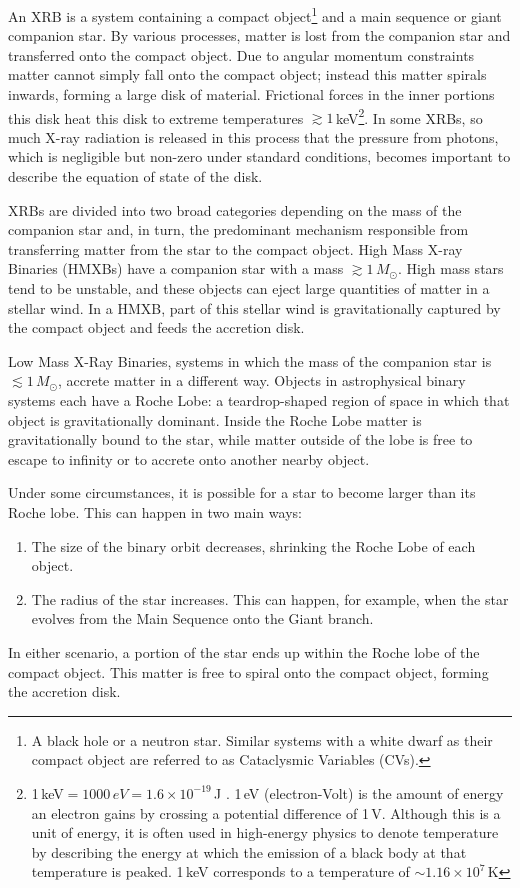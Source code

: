 \par An XRB is a system containing a compact object\footnote{A black hole or a neutron star.  Similar systems with a white dwarf as their compact object are referred to as Cataclysmic Variables (CVs).} and a main sequence or giant companion star.  By various processes, matter is lost from the companion star and transferred onto the compact object.  Due to angular momentum constraints matter cannot simply fall onto the compact object; instead this matter spirals inwards, forming a large disk of material.  Frictional forces in the inner portions this disk heat this disk to extreme temperatures $\gtrsim1$\,keV\footnote{1\,keV$=1000\,eV=1.6\times10^{-19}$\,J .  1\,eV (electron-Volt) is the amount of energy an electron gains by crossing a potential difference of 1\,V.  Although this is a unit of energy, it is often used in high-energy physics to denote temperature by describing the energy at which the emission of a black body at that temperature is peaked.  1\,keV corresponds to a temperature of $\sim1.16\times10^7$\,K}.  In some XRBs, so much X-ray radiation is released in this process that the pressure from photons, which is negligible but non-zero under standard conditions, becomes important to describe the equation of state of the disk.
\par XRBs are divided into two broad categories depending on the mass of the companion star and, in turn, the predominant mechanism responsible from transferring matter from the star to the compact object.  High Mass X-ray Binaries (HMXBs) have a companion star with a mass $\gtrsim1\,M_\odot$.  High mass stars tend to be unstable, and these objects can eject large quantities of matter in a stellar wind.  In a HMXB, part of this stellar wind is gravitationally captured by the compact object and feeds the accretion disk.
\par Low Mass X-Ray Binaries, systems in which the mass of the companion star is $\lesssim1\,M_\odot$, accrete matter in a different way.  Objects in astrophysical binary systems each have a Roche Lobe: a teardrop-shaped region of space in which that object is gravitationally dominant.  Inside the Roche Lobe matter is gravitationally bound to the star, while matter outside of the lobe is free to escape to infinity or to accrete onto another nearby object.
\par Under some circumstances, it is possible for a star to become larger than its Roche lobe.  This can happen in two main ways:
\begin{enumerate}
\item The size of the binary orbit decreases, shrinking the Roche Lobe of each object.
\item The radius of the star increases.  This can happen, for example, when the star evolves from the Main Sequence onto the Giant branch.
\end{enumerate}
In either scenario, a portion of the star ends up within the Roche lobe of the compact object.  This matter is free to spiral onto the compact object, forming the accretion disk.

